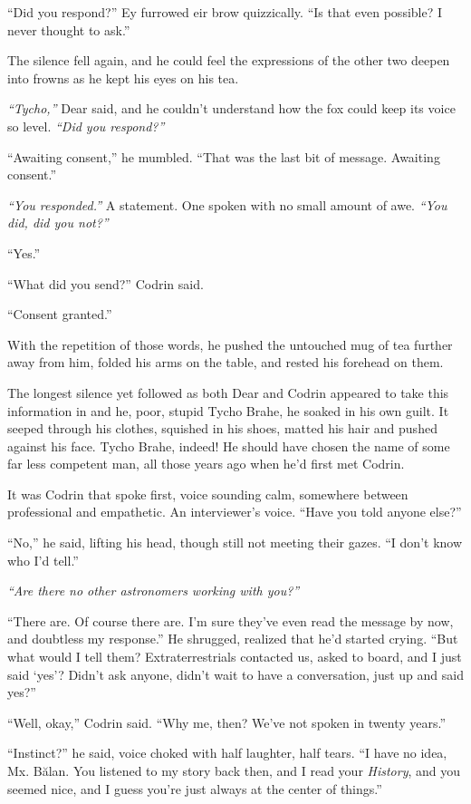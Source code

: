 ``Did you respond?'' Ey furrowed eir brow quizzically. ``Is that even possible? I never thought to ask.''

The silence fell again, and he could feel the expressions of the other two deepen into frowns as he kept his eyes on his tea.

\emph{``Tycho,''} Dear said, and he couldn't understand how the fox could keep its voice so level. \emph{``Did you respond?''}

``Awaiting consent,'' he mumbled. ``That was the last bit of message. Awaiting consent.''

\emph{``You responded.''} A statement. One spoken with no small amount of awe. \emph{``You did, did you not?''}

``Yes.''

``What did you send?'' Codrin said.

``Consent granted.''

With the repetition of those words, he pushed the untouched mug of tea further away from him, folded his arms on the table, and rested his forehead on them.

The longest silence yet followed as both Dear and Codrin appeared to take this information in and he, poor, stupid Tycho Brahe, he soaked in his own guilt. It seeped through his clothes, squished in his shoes, matted his hair and pushed against his face. Tycho Brahe, indeed! He should have chosen the name of some far less competent man, all those years ago when he'd first met Codrin.

It was Codrin that spoke first, voice sounding calm, somewhere between professional and empathetic. An interviewer's voice. ``Have you told anyone else?''

``No,'' he said, lifting his head, though still not meeting their gazes. ``I don't know who I'd tell.''

\emph{``Are there no other astronomers working with you?''}

``There are. Of course there are. I'm sure they've even read the message by now, and doubtless my response.'' He shrugged, realized that he'd started crying. ``But what would I tell them? Extraterrestrials contacted us, asked to board, and I just said `yes'? Didn't ask anyone, didn't wait to have a conversation, just up and said yes?''

``Well, okay,'' Codrin said. ``Why me, then? We've not spoken in twenty years.''

``Instinct?'' he said, voice choked with half laughter, half tears. ``I have no idea, Mx. Bălan. You listened to my story back then, and I read your \emph{History}, and you seemed nice, and I guess you're just always at the center of things.''

